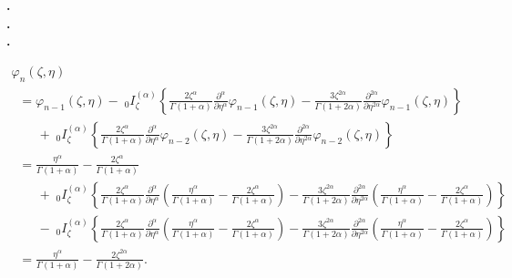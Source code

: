 \documentclass[10pt]{NSP1}
\begin{document}
\begin{center}
{\bf\large .}\\
{\bf\large .}\\
{\bf\large .}\\
\end{center}

\begin{equation}
\label{eq48}
\begin{array}{lllllll}
 \varphi _n \left( {\zeta ,\eta } \right) \\
\;\; =\varphi _{n-1} \left( {\zeta ,\eta } \right)-\;_0I_\zeta ^{\left(
\alpha \right)}\left\{ {\frac{2\zeta ^\alpha }{\Gamma \left( {1+\alpha }
\right)}\frac{\partial ^\alpha }{\partial \eta ^\alpha }\varphi _{n-1}
\left( {\zeta ,\eta } \right)-\frac{3\zeta ^{2\alpha }}{\Gamma \left(
{1+2\alpha } \right)}\frac{\partial ^{2\alpha }}{\partial \eta ^{2\alpha
}}\varphi _{n-1} \left( {\zeta ,\eta } \right)} \right\} \\
\qquad +\;_0I_\zeta ^{\left( \alpha \right)}\left\{ {\frac{2\zeta ^\alpha
}{\Gamma \left( {1+\alpha } \right)}\frac{\partial ^\alpha }{\partial \eta
^\alpha }\varphi _{n-2} \left( {\zeta ,\eta } \right)-\frac{3\zeta ^{2\alpha
}}{\Gamma \left( {1+2\alpha } \right)}\frac{\partial ^{2\alpha }}{\partial
\eta ^{2\alpha }}\varphi _{n-2} \left( {\zeta ,\eta } \right)} \right\} \\
\;\; =\frac{\eta ^\alpha }{\Gamma \left( {1+\alpha } \right)}-\frac{2\zeta
^\alpha }{\Gamma \left( {1+\alpha } \right)} \\
\qquad +\;_0I_\zeta ^{\left( \alpha \right)}\left\{ {\frac{2\zeta ^\alpha
}{\Gamma \left( {1+\alpha } \right)}\frac{\partial ^\alpha }{\partial \eta
^\alpha }\left( {\frac{\eta ^\alpha }{\Gamma \left( {1+\alpha }
\right)}-\frac{2\zeta ^\alpha }{\Gamma \left( {1+\alpha } \right)}}
\right)-\frac{3\zeta ^{2\alpha }}{\Gamma \left( {1+2\alpha }
\right)}\frac{\partial ^{2\alpha }}{\partial \eta ^{2\alpha }}\left(
{\frac{\eta ^\alpha }{\Gamma \left( {1+\alpha } \right)}-\frac{2\zeta
^\alpha }{\Gamma \left( {1+\alpha } \right)}} \right)} \right\} \\
\qquad -\;_0I_\zeta ^{\left( \alpha \right)}\left\{ {\frac{2\zeta ^\alpha
}{\Gamma \left( {1+\alpha } \right)}\frac{\partial ^\alpha }{\partial \eta
^\alpha }\left( {\frac{\eta ^\alpha }{\Gamma \left( {1+\alpha }
\right)}-\frac{2\zeta ^\alpha }{\Gamma \left( {1+\alpha } \right)}}
\right)-\frac{3\zeta ^{2\alpha }}{\Gamma \left( {1+2\alpha }
\right)}\frac{\partial ^{2\alpha }}{\partial \eta ^{2\alpha }}\left(
{\frac{\eta ^\alpha }{\Gamma \left( {1+\alpha } \right)}-\frac{2\zeta
^\alpha }{\Gamma \left( {1+\alpha } \right)}} \right)} \right\} \\
\;\; =\frac{\eta ^\alpha }{\Gamma \left( {1+\alpha } \right)}-\frac{2\zeta
^{2\alpha }}{\Gamma \left( {1+2\alpha } \right)}.
 \end{array}
\end{equation}
\end{document}
